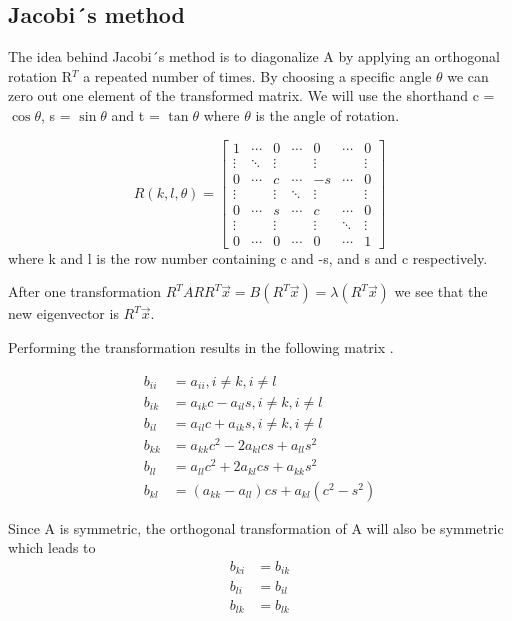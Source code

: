 \subsection*{Jacobi´s method}

The idea behind Jacobi´s method is to diagonalize A by applying an orthogonal
rotation R$^T$ a repeated number of times. By choosing a specific angle $\theta$
we can zero out one element of the transformed matrix. We will use the shorthand
c = $\cos{\theta}$, s = $\sin{\theta}$ and t = $\tan{\theta}$ where $\theta$ is
the angle of rotation.


$$R(k,l,\theta) =
\begin{bmatrix}
  1       & \cdots  & 0       & \cdots  & 0       & \cdots  & 0 \\
  \vdots  & \ddots  &  \vdots &         & \vdots  &         & \vdots \\
  0       & \cdots  & c       & \cdots  & -s      & \cdots  & 0 \\
  \vdots  &         & \vdots  & \ddots  & \vdots  &         & \vdots\\
  0       & \cdots  & s       & \cdots  & c       & \cdots  & 0\\
  \vdots  &         & \vdots  &         &  \vdots & \ddots  & \vdots\\
  0       & \cdots  & 0       & \cdots  & 0       & \cdots  & 1
\end{bmatrix}
$$
where k and l is the row number containing c and -s, and s and c respectively.


After one transformation $R^T A R R^T \vec{x} = B (R^T \vec{x}) = \lambda (R^T
\vec{x})$ we see that the new eigenvector is $R^T\vec{x}$.

Performing the transformation results in the following matrix \cite{lectures}.

\begin{align*}
  b_{ii} &= a_{ii}, i \neq k, i \neq l\\
  b_{ik} &= a_{ik}c - a_{il}s, i \neq k, i \neq l\\
  b_{il} &= a_{il}c + a_{ik}s, i \neq k, i \neq l\\
  b_{kk} &= a_{kk}c^2 - 2a_{kl}cs + a_{ll}s^2 \\
  b_{ll} &= a_{ll}c^2 + 2a_{kl}cs + a_{kk}s^2 \\
  b_{kl} &= (a_{kk}- a_{ll})cs + a_{kl}(c^2 - s^2)
\end{align*}

Since A is symmetric, the orthogonal transformation of A will also be symmetric
which leads to
\begin{align*}
  b_{ki} &= b_{ik} \\
  b_{li} &= b_{il} \\
  b_{lk} &= b_{lk}
\end{align*}

